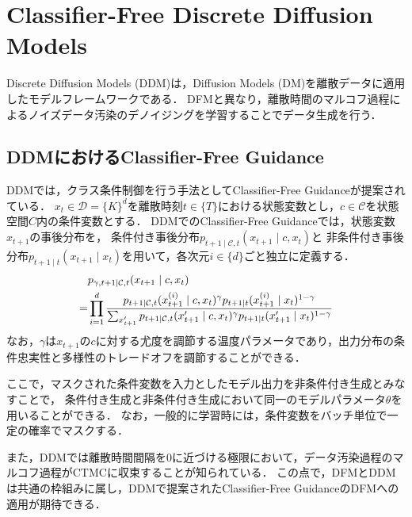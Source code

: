 \documentclass[11pt]{jsarticle}  %
\begin{document}
\section{Classifier-Free Discrete Diffusion Models\cite{CFDDM}}
\label{sec:cfg_discrete}
Discrete Diffusion Models (DDM)\cite{DDM}は，Diffusion Models (DM)\cite{DM}を離散データに適用したモデルフレームワークである．
DFMと異なり，離散時間のマルコフ過程によるノイズデータ汚染のデノイジングを学習することでデータ生成を行う．

\subsection{DDMにおけるClassifier-Free Guidance}
DDMでは，クラス条件制御を行う手法としてClassifier-Free Guidance\cite{CFDDM}が提案されている．
$x_t \in \mathcal{D} = \{K\}^d$を離散時刻$t \in \{T\}$における状態変数とし，$c\in \mathcal{C}$を状態空間$C$内の条件変数とする．
DDMでのClassifier-Free Guidanceでは，状態変数$x_{t+1}$の事後分布を，
条件付き事後分布$p_{t+1 \mid \mathcal{C}, t}(x_{t+1} \mid c,x_{t})$と
非条件付き事後分布$p_{t+1 \mid t}(x_{t+1} \mid x_{t})$を用いて，各次元$i \in \{d\}$ごと独立に定義する．
\begin{align}
  \label{eq:ddm_cfg}
  &p_{\gamma, t+1 \mid \mathcal{C}, t}(x_{t+1} \mid c,x_{t}) \notag \\
  = &\prod_{i=1}^d
    \frac{p_{t+1 \mid \mathcal{C}, t}(x_{t+1}^{(i)} \mid c,x_{t})^\gamma
      p_{t+1 \mid t}(x_{t+1}^{(i)} \mid x_{t})^{1-\gamma}}
    {\sum_{x_{t+1}'} p_{t+1 \mid \mathcal{C}, t}(x_{t+1}' \mid c,x_{t})^\gamma
    p_{t+1 \mid t}(x_{t+1}' \mid x_{t})^{1-\gamma}} \notag
\end{align}
なお，$\gamma$は$x_{t+1}$の$c$に対する尤度を調節する温度パラメータであり，出力分布の条件忠実性と多様性のトレードオフを調節することができる．

ここで，マスクされた条件変数を入力としたモデル出力を非条件付き生成とみなすことで，
条件付き生成と非条件付き生成において同一のモデルパラメータ$\theta$を用いることができる．
なお，一般的に学習時には，条件変数をバッチ単位で一定の確率でマスクする．

また，DDMでは離散時間間隔を0に近づける極限において，データ汚染過程のマルコフ過程がCTMCに収束することが知られている．
この点で，DFMとDDMは共通の枠組みに属し，DDMで提案されたClassifier-Free GuidanceのDFMへの適用が期待できる．
\end{document}
